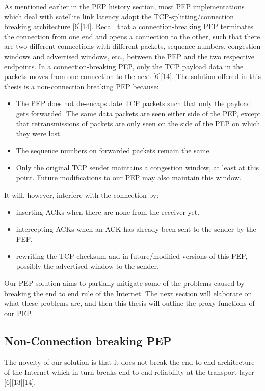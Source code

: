 \documentclass{uathesis}
\begin{document}
As mentioned earlier in the PEP history section, most PEP implementations which deal with satellite link latency adopt the TCP-splitting/connection breaking architecture [6][14]. Recall that a connection-breaking PEP terminates the connection from one end and opens a connection to the other, such that there are two different connections with different packets, sequence numbers, congestion windows and advertised windows, etc., between the PEP and the two respective endpoints. In a connection-breaking PEP, only the TCP payload data in the packets moves from one connection to the next [6][14]. The solution offered in this thesis is a non-connection breaking PEP because:\\

\begin{itemize}
\item The PEP does not de-encapsulate TCP packets such that only the payload gets forwarded. The same data packets are seen either side of the PEP, except that retransmissions of packets are only seen on the side of the PEP on which they were lost.
\item The sequence numbers on forwarded packets remain the same. 
\item Only the original TCP sender maintains a congestion window, at least at this point. Future modifications to our PEP may also maintain this window.\\
\end{itemize}

It will, however, interfere with the connection by: \\

\begin{itemize}
\item inserting ACKs when there are none from the receiver yet.
\item intercepting ACKs when an ACK has already been sent to the sender by the PEP.
\item rewriting the TCP checksum and in future/modified versions of this PEP, possibly the advertised window to the sender.\\
\end{itemize}

Our PEP solution aims to partially mitigate some of the problems caused by breaking the end to end rule of the Internet. The next section will elaborate on what these problems are, and then this thesis will outline the proxy functions of our PEP. 

\subsection{ Non-Connection breaking PEP}
The novelty of our solution is that it does not break the end to end architecture of the Internet which in turn breaks end to end reliability at the transport layer [6][13][14]. \\
\end{document}
